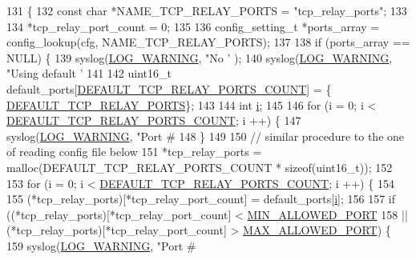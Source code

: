 \begin{DoxyCode}
131 \{
132     \textcolor{keyword}{const} \textcolor{keywordtype}{char} *NAME\_TCP\_RELAY\_PORTS = \textcolor{stringliteral}{"tcp\_relay\_ports"};
133 
134     *tcp\_relay\_port\_count = 0;
135 
136     config\_setting\_t *ports\_array = config\_lookup(cfg, NAME\_TCP\_RELAY\_PORTS);
137 
138     \textcolor{keywordflow}{if} (ports\_array == NULL) \{
139         syslog(\hyperlink{logger_8h_aa5a9053636a30269210c54e734e0d583a8f6fe15bfe15104da6d1b360194a5400}{LOG\_WARNING}, \textcolor{stringliteral}{"No '%
      );
140         syslog(\hyperlink{logger_8h_aa5a9053636a30269210c54e734e0d583a8f6fe15bfe15104da6d1b360194a5400}{LOG\_WARNING}, \textcolor{stringliteral}{"Using default '%
141 
142         uint16\_t default\_ports[\hyperlink{tox-bootstrapd_8c_a8cd528f2dfb339311387dcb43608ceef}{DEFAULT\_TCP\_RELAY\_PORTS\_COUNT}] = \{
      \hyperlink{tox-bootstrapd_8c_a2d597b4c5dbb34d2f7e5387e8aa8d13d}{DEFAULT\_TCP\_RELAY\_PORTS}\};
143 
144         \textcolor{keywordtype}{int} \hyperlink{toxav__many__test_8c_acb559820d9ca11295b4500f179ef6392}{i};
145 
146         \textcolor{keywordflow}{for} (i = 0; i < \hyperlink{tox-bootstrapd_8c_a8cd528f2dfb339311387dcb43608ceef}{DEFAULT\_TCP\_RELAY\_PORTS\_COUNT}; i ++) \{
147             syslog(\hyperlink{logger_8h_aa5a9053636a30269210c54e734e0d583a8f6fe15bfe15104da6d1b360194a5400}{LOG\_WARNING}, \textcolor{stringliteral}{"Port #%
148         \}
149 
150         \textcolor{comment}{// similar procedure to the one of reading config file below}
151         *tcp\_relay\_ports = malloc(DEFAULT\_TCP\_RELAY\_PORTS\_COUNT * \textcolor{keyword}{sizeof}(uint16\_t));
152 
153         \textcolor{keywordflow}{for} (i = 0; i < \hyperlink{tox-bootstrapd_8c_a8cd528f2dfb339311387dcb43608ceef}{DEFAULT\_TCP\_RELAY\_PORTS\_COUNT}; i ++) \{
154 
155             (*tcp\_relay\_ports)[*tcp\_relay\_port\_count] = default\_ports[\hyperlink{toxav__many__test_8c_acb559820d9ca11295b4500f179ef6392}{i}];
156 
157             \textcolor{keywordflow}{if} ((*tcp\_relay\_ports)[*tcp\_relay\_port\_count] < \hyperlink{tox-bootstrapd_8c_a3ef213aa33f9321104faf75dfe823623}{MIN\_ALLOWED\_PORT}
158                     || (*tcp\_relay\_ports)[*tcp\_relay\_port\_count] > 
      \hyperlink{tox-bootstrapd_8c_a83828e6f5b4b788b1781b298a3a221cd}{MAX\_ALLOWED\_PORT}) \{
159                 syslog(\hyperlink{logger_8h_aa5a9053636a30269210c54e734e0d583a8f6fe15bfe15104da6d1b360194a5400}{LOG\_WARNING}, \textcolor{stringliteral}{"Port #%
}}}}
\end{DoxyCode}
